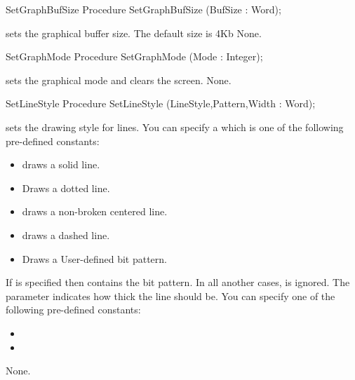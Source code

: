\begin{procedure}{SetGraphBufSize}
\Declaration
Procedure SetGraphBufSize (BufSize : Word);

\Description
{} 
sets the graphical buffer size. The default size is 4Kb
\Errors
None.
\SeeAlso

\end{procedure}
\begin{procedure}{SetGraphMode}
\Declaration
Procedure SetGraphMode (Mode : Integer);

\Description
{} sets the
graphical mode and clears the screen.
\Errors
None.
\SeeAlso
{}
\end{procedure}
\begin{procedure}{SetLineStyle}
\Declaration
Procedure SetLineStyle (LineStyle,Pattern,Width :
Word);

\Description
{}
sets the drawing style for lines. You can specify a  which is
one of the following pre-defined constants:
\begin{itemize}
\item {} draws a solid line.
\item {} Draws a dotted line.
\item {} draws a non-broken centered line.
\item {} draws a dashed line.
\item {} Draws a User-defined bit pattern.
\end{itemize}
If  is specified then  contains the bit pattern.
In all another cases,  is ignored. The parameter 
indicates how thick the line should be. You can specify one of the following
pre-defined constants:
\begin{itemize}
\item {}
\item {}
\end{itemize}

\Errors
None.
\SeeAlso
{}
\end{procedure}
